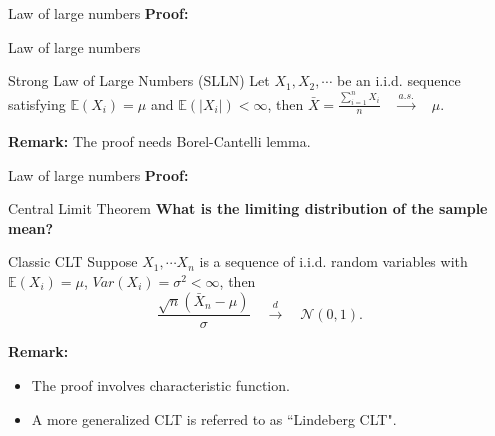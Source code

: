 \documentclass [aspectratio=169]{beamer}
\newcommand{\mc}{\mathcal}
\begin{document}
\begin{frame}{Law of large numbers}
\textbf{Proof:}\\
\vspace{1.5in}
\end{frame}


\begin{frame}{Law of large numbers}
    \begin{block}{Strong Law of Large Numbers (SLLN)}
    Let $X_1, X_2, \cdots$ be an i.i.d. sequence satisfying $\mathbb{E}(X_i) = \mu$ and $\mathbb{E}(|X_i|) < \infty$, then 
    $\bar{X} = \frac{\sum_{i = 1}^n X_i}{n} \quad \xrightarrow[]{a.s.} \quad \mu $.
    \end{block}
    \vspace{0.1in}
    \textbf{Remark:} The proof needs Borel-Cantelli lemma.
    \vspace{0.1in}
\end{frame}

\begin{frame}{Law of large numbers}
    \textbf{Proof:}\\
    \vspace{2.5in}
\end{frame}

\begin{frame}{Central Limit Theorem}
\textbf{What is the limiting distribution of the sample mean?}\\
\begin{block}{Classic CLT}
Suppose $X_1, \cdots X_n$ is a sequence of i.i.d. random variables with $\mathbb{E}(X_i) = \mu$, $Var(X_i) = \sigma^2 < \infty$, then
$$
\frac{\sqrt{n}(\bar{X}_n - \mu)}{\sigma} \quad \xrightarrow[]{d} \quad \mc{N}(0,1).
$$
\end{block}
\vspace{0.1in}
\textbf{Remark:}\\
\begin{itemize}
    \item The proof involves characteristic function.
    \item A more generalized CLT is referred to as ``Lindeberg CLT". 
\end{itemize}
\end{frame}
\end{document}
